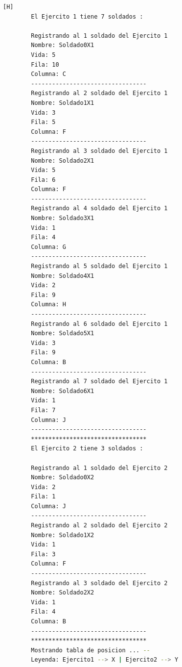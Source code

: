 \documentclass{article}
\begin{document}
	\begin{lstlisting}[language=bash,caption={La ejecución: \textcolor{red}{PARA PODER VER LA TABLA COMPLETAMENTE MIRAR LA PLANTILLA DE LATEX O EJECUTARLO: }}][H]
		El Ejercito 1 tiene 7 soldados : 

		Registrando al 1 soldado del Ejercito 1
		Nombre: Soldado0X1
		Vida: 5
		Fila: 10
		Columna: C
		---------------------------------
		Registrando al 2 soldado del Ejercito 1
		Nombre: Soldado1X1
		Vida: 3
		Fila: 5
		Columna: F
		---------------------------------
		Registrando al 3 soldado del Ejercito 1
		Nombre: Soldado2X1
		Vida: 5
		Fila: 6
		Columna: F
		---------------------------------
		Registrando al 4 soldado del Ejercito 1
		Nombre: Soldado3X1
		Vida: 1
		Fila: 4
		Columna: G
		---------------------------------
		Registrando al 5 soldado del Ejercito 1
		Nombre: Soldado4X1
		Vida: 2
		Fila: 9
		Columna: H
		---------------------------------
		Registrando al 6 soldado del Ejercito 1
		Nombre: Soldado5X1
		Vida: 3
		Fila: 9
		Columna: B
		---------------------------------
		Registrando al 7 soldado del Ejercito 1
		Nombre: Soldado6X1
		Vida: 1
		Fila: 7
		Columna: J
		---------------------------------
		*********************************
		El Ejercito 2 tiene 3 soldados : 
		
		Registrando al 1 soldado del Ejercito 2
		Nombre: Soldado0X2
		Vida: 2
		Fila: 1
		Columna: J
		---------------------------------
		Registrando al 2 soldado del Ejercito 2
		Nombre: Soldado1X2
		Vida: 1
		Fila: 3
		Columna: F
		---------------------------------
		Registrando al 3 soldado del Ejercito 2
		Nombre: Soldado2X2
		Vida: 1
		Fila: 4
		Columna: B
		---------------------------------
		*********************************
		Mostrando tabla de posicion ... --
		Leyenda: Ejercito1 --> X | Ejercito2 --> Y
		

\end{lstlisting}
\end{document}
